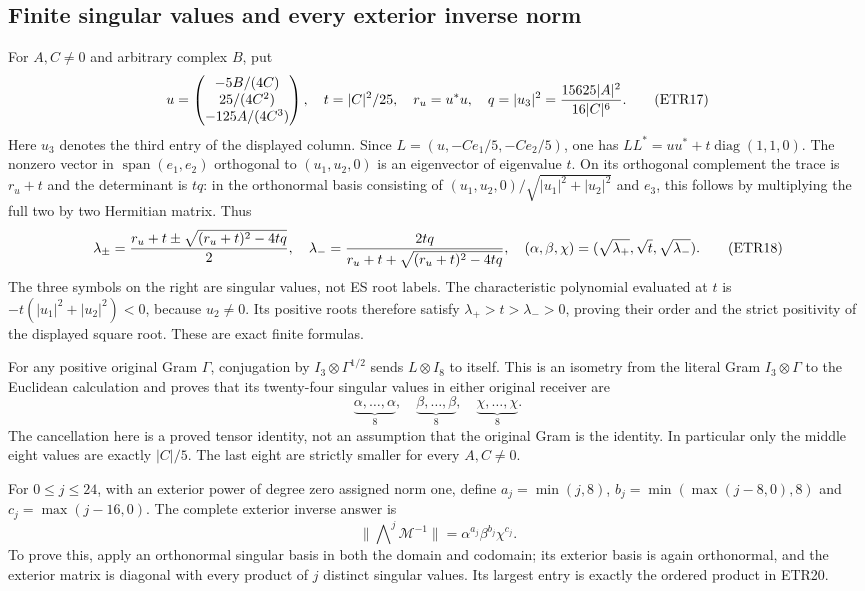 \documentclass[11pt]{article}
\begin{document}
\subsection{Finite singular values and every exterior inverse norm}
For $A,C\ne0$ and arbitrary complex $B$, put
\[
 u=\begin{pmatrix}-5B/(4C)\\25/(4C^2)\\-125A/(4C^3)\end{pmatrix},\quad
 t=|C|^2/25,\quad r_u=u^*u,\quad q=|u_3|^2
      ={15625|A|^2\over16|C|^6}.
                                                               \tag{ETR17}
\]
Here $u_3$ denotes the third entry of the displayed column. Since
$L=(u,-Ce_1/5,-Ce_2/5)$, one has
$LL^*=uu^*+t\operatorname{diag}(1,1,0)$. The nonzero vector in
$\operatorname{span}(e_1,e_2)$ orthogonal to $(u_1,u_2,0)$ is an
eigenvector of eigenvalue $t$. On its orthogonal complement the
trace is $r_u+t$ and the determinant is $tq$: in the orthonormal basis
consisting of $(u_1,u_2,0)/\sqrt{|u_1|^2+|u_2|^2}$ and $e_3$, this
follows by multiplying the full two by two Hermitian matrix. Thus
\[
 \lambda_\pm={r_u+t\pm\sqrt{(r_u+t)^2-4tq}\over2},\quad
 \lambda_-={2tq\over r_u+t+\sqrt{(r_u+t)^2-4tq}},\quad
 (\alpha,\beta,\chi)=(\sqrt{\lambda_+},\sqrt t,\sqrt{\lambda_-}).
                                                               \tag{ETR18}
\]
The three symbols on the right are singular values, not ES root labels.
The characteristic polynomial evaluated at $t$ is
$-t(|u_1|^2+|u_2|^2)<0$, because $u_2\ne0$. Its positive roots therefore
satisfy $\lambda_+>t>\lambda_->0$, proving their order and the strict
positivity of the displayed square root. These are exact finite formulas.

For any positive original Gram $\Gamma$, conjugation by
$I_3\otimes\Gamma^{1/2}$ sends $L\otimes I_8$ to itself. This is an
isometry from the literal Gram $I_3\otimes\Gamma$ to the Euclidean
calculation and proves that its twenty-four singular values in either
original receiver are
\[
 \underbrace{\alpha,\ldots,\alpha}_{8},\quad
 \underbrace{\beta,\ldots,\beta}_{8},\quad
 \underbrace{\chi,\ldots,\chi}_{8}.                     \tag{ETR19}
\]
The cancellation here is a proved tensor identity, not an assumption
that the original Gram is the identity. In particular only the middle
eight values are exactly $|C|/5$. The last eight are strictly smaller
for every $A,C\ne0$.

For $0\le j\le24$, with an exterior power of degree zero assigned
norm one, define $a_j=\min(j,8)$, $b_j=\min(\max(j-8,0),8)$ and
$c_j=\max(j-16,0)$. The complete exterior inverse answer is
\[
 \|\mathop{\bigwedge}\nolimits^j\mathcal M^{-1}\|
       =\alpha^{a_j}\beta^{b_j}\chi^{c_j}.               \tag{ETR20}
\]
To prove this, apply an orthonormal singular basis in both the domain
and codomain; its exterior basis is again orthonormal, and the exterior
matrix is diagonal with every product of $j$ distinct singular values.
Its largest entry is exactly the ordered product in ETR20.
\end{document}
